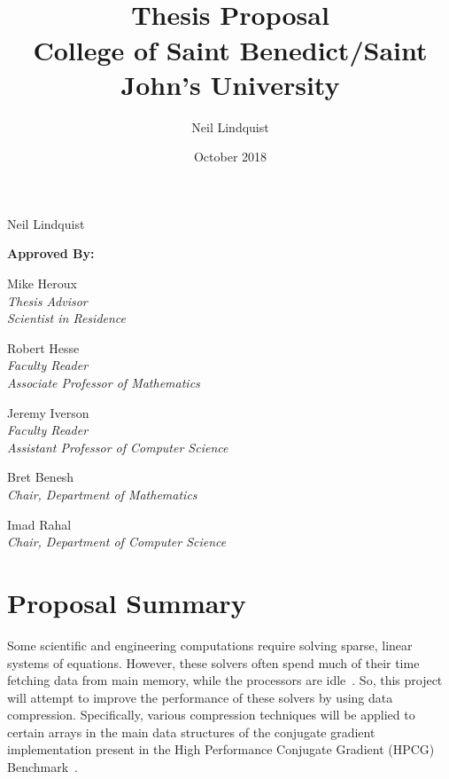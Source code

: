 \documentclass[titlepage]{article}
\begin{document}
\title{
	 \\
	\bigskip
	\Large Thesis Proposal\\
	\bigskip
	College of Saint Benedict/Saint John's University}
\author{Neil Lindquist}
\date{October 2018}

\maketitle

\begin{center}
	{\Large }
	
	Neil Lindquist 
	
	\bigskip
	\bigskip
	
	\textbf{Approved By:}
	
	\bigskip
	
	Mike Heroux\\
	\textit{Thesis Advisor}\\
	\textit{Scientist in Residence}

	\bigskip

	Robert Hesse\\
	\textit{Faculty Reader}\\
	\textit{Associate Professor of Mathematics}

	\bigskip

	Jeremy Iverson\\
	\textit{Faculty Reader}\\
	\textit{Assistant Professor of Computer Science}
	
	\bigskip

	Bret Benesh\\
	\textit{Chair, Department of Mathematics}
	
	\bigskip
	
	Imad Rahal\\
	\textit{Chair, Department of Computer Science}
\end{center}

\clearpage


\section{Proposal Summary}
Some scientific and engineering computations require solving sparse, linear systems of equations.
However, these solvers often spend much of their time fetching data from main memory, while the processors are idle~\cite{Goumas:2009:performanceEval}.
So, this project will attempt to improve the performance of these solvers by using data compression.
Specifically, various compression techniques will be applied to certain arrays in the main data structures of the conjugate gradient implementation present in the High Performance Conjugate Gradient (HPCG) Benchmark~\cite{Dongarra:2015:HPCG}.
\end{document}
